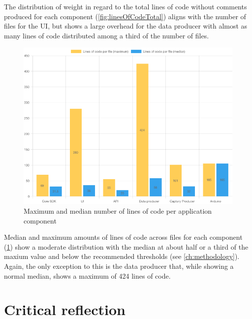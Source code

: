 The distribution of weight in regard to the total lines of code without comments produced for each component (\ref{fig:linesOfCodeTotal}) aligns with the number of files for the \ac{UI}, but shows a large overhead for the data producer with almost as many lines of code distributed among a third of the number of files.

\begin{figure}[h]
\centering
\includegraphics[scale=0.5]{04_Artefakte/01_Abbildungen/code-stats-loc}
\caption[Lines of code]{Maximum and median number of lines of code per application component\protect}
\label{fig:linesOfCode}
\end{figure}

Median and maximum amounts of lines of code across files for each component (\ref{fig:linesOfCode}) show a moderate distribution with the median at about half or a third of the maxium value and below the recommended thresholds (see \autoref{ch:methodology}). Again, the only exception to this is the data producer that, while showing a normal median, shows a maximum of 424 lines of code.

\section{Critical reflection}
\label{sec:critical-reflection}


